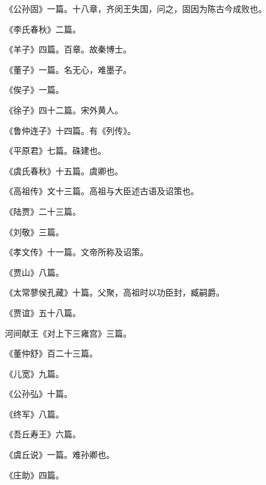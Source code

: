 \documentclass[12pt,UTF8]{ctexbook}
\begin{document}
《公孙固》一篇。十八章，齐闵王失国，问之，固因为陈古今成败也。



《李氏春秋》二篇。



《羊子》四篇。百章。故秦博士。



《董子》一篇。名无心，难墨子。



《俟子》一篇。



《徐子》四十二篇。宋外黄人。



《鲁仲连子》十四篇。有《列传》。



《平原君》七篇。硃建也。



《虞氏春秋》十五篇。虞卿也。



《高祖传》文十三篇。高祖与大臣述古语及诏策也。



《陆贾》二十三篇。



《刘敬》三篇。



《孝文传》十一篇。文帝所称及诏策。



《贾山》八篇。



《太常蓼侯孔藏》十篇。父聚，高祖时以功臣封，臧嗣爵。



《贾谊》五十八篇。



河间献王《对上下三雍宫》三篇。



《董仲舒》百二十三篇。



《儿宽》九篇。



《公孙弘》十篇。



《终军》八篇。



《吾丘寿王》六篇。



《虞丘说》一篇。难孙卿也。



《庄助》四篇。
\end{document}
